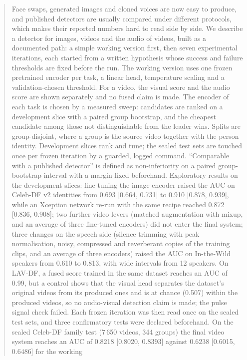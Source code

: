 \documentclass[conference,a4paper]{IEEEtran_nodash}
\begin{document}
\begin{abstract}
Face swaps, generated images and cloned voices are now easy to produce, and
published detectors are usually compared under different protocols, which makes
their reported numbers hard to read side by side. We describe a detector for
images, videos and the audio of videos, built as a documented path: a simple
working version first, then seven experimental iterations, each started from a
written hypothesis whose success and failure thresholds are fixed before the
run. The working version uses one frozen pretrained encoder per task, a linear
head, temperature scaling and a validation-chosen threshold. For a video, the
visual score and the audio score are shown separately and no fused claim is
made. The encoder of each task is chosen by a measured sweep: candidates are
ranked on a development slice with a paired group bootstrap, and the cheapest
candidate among those not distinguishable from the leader wins. Splits are
group-disjoint, where a group is the source video together with the person
identity. Development slices rank and tune; the sealed
test sets are touched once per frozen iteration by a guarded, logged
command. ``Comparable with a published detector'' is defined as non-inferiority
on a paired group-bootstrap interval with a margin fixed beforehand.
Exploratory results on the development slices: fine-tuning the image encoder
raised the AUC on Celeb-DF v2 identities from 0.693 [0.664, 0.731] to
0.910 [0.878, 0.939], while an Xception network re-run with the same recipe
reached 0.872 [0.836, 0.908]; two further video levers (matched augmentation
with mixup, and an average of three fine-tuned encoders) did not enter the
final system; three changes on the speech side (silence
trimming with peak normalisation, noisy, compressed and reverberant copies of
the training clips, and an average of three encoders) raised the AUC on
In-the-Wild speakers from 0.610 to 0.813, with wide intervals from 12 speakers.
On LAV-DF, a fused score trained in the same dataset reaches an AUC of 0.99, but
a control shows that the visual head separates the dataset's original videos
from its produced ones and is at chance (0.507) within the produced videos, so
no audio-visual detection claim is made; the pulse signal check failed.
Each frozen iteration was then read once on the sealed test sets, and three
confirmatory tests were declared beforehand. On the sealed Celeb-DF family test
(7\,650 videos, 344 groups) the final video system reaches an AUC of
0.8218 [0.8020, 0.8393] against 0.6238 [0.6015, 0.6486] for the working

\end{abstract}
\end{document}
